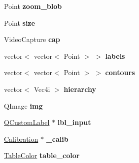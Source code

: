 \begin{DoxyCompactItemize}
\item 
\hypertarget{classcalibration_af15b11ca11726a106ce3581d28ae2fe2}{Point {\bfseries zoom\-\_\-blob}}\label{classcalibration_af15b11ca11726a106ce3581d28ae2fe2}

\item 
\hypertarget{classcalibration_a10327f11f7951f4282ada6c354e62522}{Point {\bfseries size}}\label{classcalibration_a10327f11f7951f4282ada6c354e62522}

\item 
\hypertarget{classcalibration_a4fbb8e4cac6239dc7135963c0f500105}{Video\-Capture {\bfseries cap}}\label{classcalibration_a4fbb8e4cac6239dc7135963c0f500105}

\item 
\hypertarget{classcalibration_ac1a1606070bf5b667f1e7a07e3e08d1d}{vector$<$ vector$<$ Point $>$ $>$ {\bfseries labels}}\label{classcalibration_ac1a1606070bf5b667f1e7a07e3e08d1d}

\item 
\hypertarget{classcalibration_a81c7edbfe89f8f1692193bc81309a55d}{vector$<$ vector$<$ Point $>$ $>$ {\bfseries contours}}\label{classcalibration_a81c7edbfe89f8f1692193bc81309a55d}

\item 
\hypertarget{classcalibration_a818940843ae109ee2e7bd3cb202c4704}{vector$<$ Vec4i $>$ {\bfseries hierarchy}}\label{classcalibration_a818940843ae109ee2e7bd3cb202c4704}

\item 
\hypertarget{classcalibration_abb31447445117b52af6865628355a76a}{Q\-Image {\bfseries img}}\label{classcalibration_abb31447445117b52af6865628355a76a}

\item 
\hypertarget{classcalibration_ade63c6e2fc49e68c15514133f30cbc65}{\hyperlink{classQCustomLabel}{Q\-Custom\-Label} $\ast$ {\bfseries lbl\-\_\-input}}\label{classcalibration_ade63c6e2fc49e68c15514133f30cbc65}

\item 
\hypertarget{classcalibration_ad523b82addd861c31202b3d0d152f848}{\hyperlink{structcommon_1_1Calibration}{Calibration} $\ast$ {\bfseries \-\_\-calib}}\label{classcalibration_ad523b82addd861c31202b3d0d152f848}

\item 
\hypertarget{classcalibration_a941d98916460576b4bb2bfe9dd7c8f85}{\hyperlink{structcommon_1_1TableColor}{Table\-Color} {\bfseries table\-\_\-color}}\label{classcalibration_a941d98916460576b4bb2bfe9dd7c8f85}

\end{DoxyCompactItemize}


